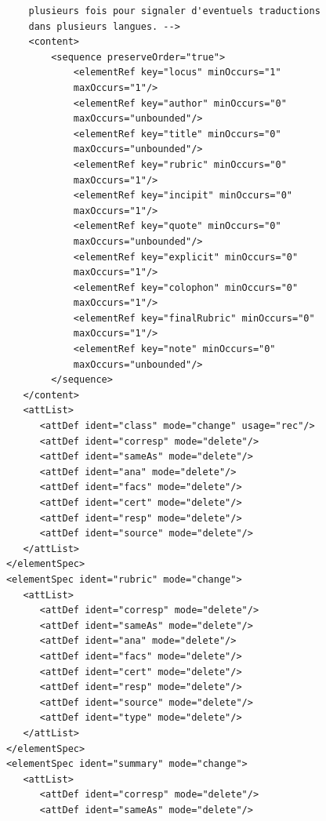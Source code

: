\documentclass[a4paper,12pt,twoside]{book}
\begin{document}
\begin{verbatim}
                plusieurs fois pour signaler d'eventuels traductions 
                dans plusieurs langues. -->
                <content>
                    <sequence preserveOrder="true">
                        <elementRef key="locus" minOccurs="1" 
                        maxOccurs="1"/>
                        <elementRef key="author" minOccurs="0" 
                        maxOccurs="unbounded"/>
                        <elementRef key="title" minOccurs="0" 
                        maxOccurs="unbounded"/>
                        <elementRef key="rubric" minOccurs="0" 
                        maxOccurs="1"/>
                        <elementRef key="incipit" minOccurs="0" 
                        maxOccurs="1"/>
                        <elementRef key="quote" minOccurs="0" 
                        maxOccurs="unbounded"/>
                        <elementRef key="explicit" minOccurs="0" 
                        maxOccurs="1"/>
                        <elementRef key="colophon" minOccurs="0" 
                        maxOccurs="1"/>
                        <elementRef key="finalRubric" minOccurs="0" 
                        maxOccurs="1"/>
                        <elementRef key="note" minOccurs="0" 
                        maxOccurs="unbounded"/>
                    </sequence>
               </content>
               <attList>
                  <attDef ident="class" mode="change" usage="rec"/>
                  <attDef ident="corresp" mode="delete"/>
                  <attDef ident="sameAs" mode="delete"/>
                  <attDef ident="ana" mode="delete"/>
                  <attDef ident="facs" mode="delete"/>
                  <attDef ident="cert" mode="delete"/>
                  <attDef ident="resp" mode="delete"/>
                  <attDef ident="source" mode="delete"/>
               </attList>
            </elementSpec>
            <elementSpec ident="rubric" mode="change">
               <attList>
                  <attDef ident="corresp" mode="delete"/>
                  <attDef ident="sameAs" mode="delete"/>
                  <attDef ident="ana" mode="delete"/>
                  <attDef ident="facs" mode="delete"/>
                  <attDef ident="cert" mode="delete"/>
                  <attDef ident="resp" mode="delete"/>
                  <attDef ident="source" mode="delete"/>
                  <attDef ident="type" mode="delete"/>
               </attList>
            </elementSpec>
            <elementSpec ident="summary" mode="change">
               <attList>
                  <attDef ident="corresp" mode="delete"/>
                  <attDef ident="sameAs" mode="delete"/>

\end{verbatim}
\end{document}
